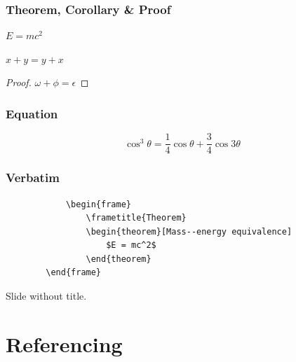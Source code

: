 \documentclass[
	11pt, %
	aspectratio=169, %
]{beamer}
\begin{document}
\begin{frame}
	\frametitle{Theorem, Corollary \& Proof}
	
	\begin{theorem}
		$E = mc^2$
	\end{theorem}
	
	\begin{corollary}
		$x + y = y + x$
	\end{corollary}
	
	\begin{proof}
		$\omega + \phi = \epsilon$
	\end{proof}
\end{frame}


\begin{frame}
	\frametitle{Equation}

	\begin{equation}
		\cos^3 \theta =\frac{1}{4}\cos\theta+\frac{3}{4}\cos 3\theta
	\end{equation}
\end{frame}


\begin{frame}[fragile] %
	\frametitle{Verbatim}
	
	\begin{example}
		\begin{verbatim}
			\begin{frame}
				\frametitle{Theorem}
				\begin{theorem}[Mass--energy equivalence]
					$E = mc^2$
				\end{theorem}
		\end{frame}\end{verbatim} %
	\end{example}
\end{frame}


\begin{frame}
	Slide without title.
\end{frame}


\section{Referencing}
\end{document}
